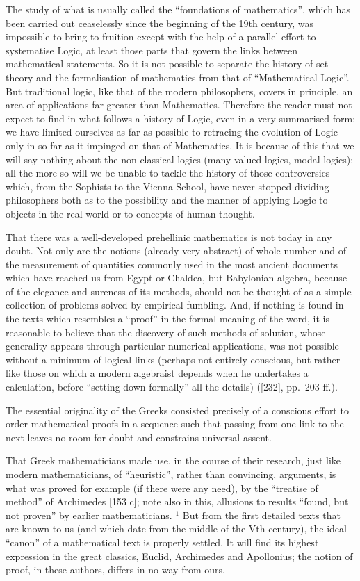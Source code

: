 The study of what is usually called the ``foundations of mathematics'', which has been carried out ceaselessly since the beginning of the 19th century, was impossible to bring to fruition except with the help of a parallel effort to systematise Logic, at least those parts that govern the links between mathematical statements. So it is not possible to separate the history of set theory and the formalisation of mathematics from that of ``Mathematical Logic''. But traditional logic, like that of the modern philosophers, covers in principle, an area of applications far greater than Mathematics. Therefore the reader must not expect to find in what follows a history of Logic, even in a very summarised form; we have limited ourselves as far as possible to retracing the evolution of Logic only in so far as it impinged on that of Mathematics. It is because of this that we will say nothing about the non-classical logics (many-valued logics, modal logics); all the more so will we be unable to tackle the history of those controversies which, from the Sophists to the Vienna School, have never stopped dividing philosophers both as to the possibility and the manner of applying Logic to objects in the real world or to concepts of human thought.

That there was a well-developed prehellinic mathematics is not today in any doubt. Not only are the notions (already very abstract) of whole number and of the measurement of quantities commonly used in the most ancient documents which have reached us from Egypt or Chaldea, but Babylonian algebra, because of the elegance and sureness of its methods, should not be thought of as a simple collection of problems solved by empirical fumbling. And, if nothing is found in the texts which resembles a ``proof'' in the formal meaning of the word, it is reasonable to believe that the discovery of such methods of solution, whose generality appears through particular numerical applications, was not possible without a minimum of logical links (perhaps not entirely conscious, but rather like those on which a modern algebraist depends when he undertakes a calculation, before ``setting down formally'' all the details) ({[}232{]}, pp.~203 ff.).

The essential originality of the Greeks consisted precisely of a conscious effort to order mathematical proofs in a sequence such that passing from one link to the next leaves no room for doubt and constrains universal assent.

That Greek mathematicians made use, in the course of their research, just like modern mathematicians, of ``heuristic'', rather than convincing, arguments, is what was proved for example (if there were any need), by the ``treatise of method'' of Archimedes {[}153 c{]}; note also in this, allusions to results ``found, but not proven'' by earlier mathematicians. \(^{1}\) But from the first detailed texts that are known to us (and which date from the middle of the Vth century), the ideal ``canon'' of a mathematical text is properly settled. It will find its highest expression in the great classics, Euclid, Archimedes and Apollonius; the notion of proof, in these authors, differs in no way from ours.

